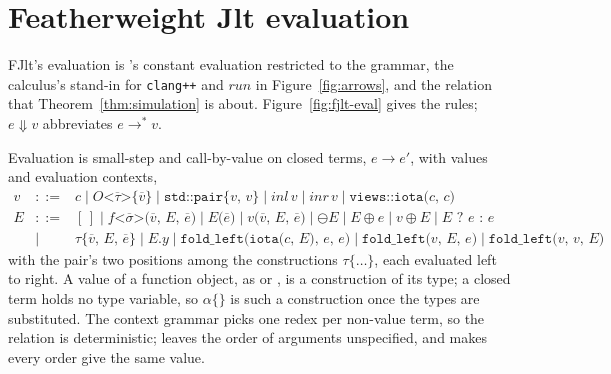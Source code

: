 \section{Featherweight Jlt evaluation}
\label{app:fjlt:evaluation}

FJlt's evaluation is \Cpp{}'s constant evaluation restricted to the grammar, the calculus's stand-in for \texttt{clang++} and $\mathit{run}$ in Figure~\ref{fig:arrows}, and the relation that Theorem~\ref{thm:simulation} is about.
Figure~\ref{fig:fjlt-eval} gives the rules; $e \Downarrow v$ abbreviates $e \longrightarrow^{*} v$.

Evaluation is small-step and call-by-value on closed terms, $e \longrightarrow e'$, with values and evaluation contexts,
\[
\begin{array}{rcl}
v &::=& c \mid O\texttt{<}\overline{\tau}\texttt{>\{}\overline{v}\texttt{\}} \mid \texttt{std::pair\{}v\texttt{, }v\texttt{\}} \mid \mathit{inl}\,v \mid \mathit{inr}\,v \mid \texttt{views::iota(}c\texttt{, }c\texttt{)} \\
E &::=& [\,] \mid f\texttt{<}\overline{\sigma}\texttt{>(}\overline{v}\texttt{, }E\texttt{, }\overline{e}\texttt{)} \mid E\texttt{(}\overline{e}\texttt{)} \mid v\texttt{(}\overline{v}\texttt{, }E\texttt{, }\overline{e}\texttt{)} \mid \ominus E \mid E \oplus e \mid v \oplus E \mid E \texttt{ ? } e \texttt{ : } e \\
  &\mid& \tau\texttt{\{}\overline{v}\texttt{, }E\texttt{, }\overline{e}\texttt{\}} \mid E\texttt{.}y \mid \texttt{fold\_left(iota(}c\texttt{, }E\texttt{), }e\texttt{, }e\texttt{)} \mid \texttt{fold\_left(}v\texttt{, }E\texttt{, }e\texttt{)} \mid \texttt{fold\_left(}v\texttt{, }v\texttt{, }E\texttt{)}
\end{array}
\]
with the pair's two positions among the constructions $\tau\texttt{\{}\ldots\texttt{\}}$, each evaluated left to right.
A value of a function object, as  or , is a construction of its type; a closed term holds no type variable, so $\alpha\texttt{\{\}}$ is such a construction once the types are substituted.
The context grammar picks one redex per non-value term, so the relation is deterministic; \Cpp{} leaves the order of arguments unspecified, and \RuleOne{} makes every order give the same value.

